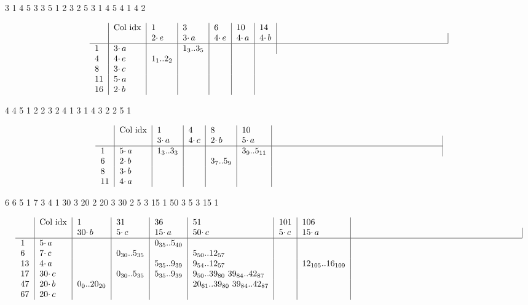 \documentclass{article}
\begin{document}
3 1   4 5   3 3   5 1   2 3
2 5   3 1   4 5   4 1   4 2


\[ \begin{tabular} {l | l | *{5}{l|} p{66mm} | }
& Col idx & 1 & 3 & 6 & 10 & 14   \\
 & & $2 \cdotp e$ & $3 \cdotp a$ & $4 \cdotp e$ & $4 \cdotp a$ & $4 \cdotp b$ &    \\
\hline 
1 & $3 \cdotp a$  &   & $1_{3}$..$3_{5}$   &     &   &    \\
4 & $4 \cdotp e$  & $1_{1}$..$2_{2}$  &     &   &    \\
8 & $3 \cdotp c$  &   &     &   &    \\
11 & $5 \cdotp a$  &   &     &   &    \\
16 & $2 \cdotp b$  &   &     &   &    \\
\end{tabular} \]

4 4
5 1    2 2    3 2     4 1
3 1    4 3    2 2     5 1

\[ \begin{tabular} {l | l | *{4}{l|} p{66mm} | }
& Col idx & 1 & 4 & 8 & 10    \\
 & & $3 \cdotp a$ & $4 \cdotp c$ & $2 \cdotp b$ & $5 \cdotp a$  &    \\
\hline 
1 & $5 \cdotp a$  &  $1_{3}$..$3_{3}$  &   &     &  $3_{9}$..$5_{11}$  &    \\
6 & $2 \cdotp b$  &   &     & $3_{7}$..$5_{9}$  &    \\
8 & $3 \cdotp b$  &   &     &   &    \\
11 & $4 \cdotp a$  &   &     &   &    \\
\end{tabular} \]

6 6
5 1   7 3    4 1    30 3    20 2    20 3         
30 2  5 3    15 1   50 3    5  3    15 1




\[ \begin{tabular} {l | l | *{6}{l|} p{66mm} | }
& Col idx & 1 & 31 & 36 & 51 & 101 & 106    \\
 & & $30 \cdotp b$ & $5 \cdotp c$ & $15 \cdotp a$ & $50 \cdotp c$  & $5 \cdotp c$  & $15 \cdotp a$  &  \\
\hline 
1 & $5 \cdotp a$  &    &   &  $0_{35}$..$5_{40}$   &    &   & \\
6 & $7 \cdotp c$  &   & $0_{30}$..$5_{35}$    &   & $5_{50}$..$12_{57}$ & &   \\
13 & $4 \cdotp a$  &   &     &  $5_{35}$..$9_{39}$ &  $9_{54}$..$12_{57}$  &   & $12_{105}$..$16_{109}$  \\
17 & $30 \cdotp c$  &   & $0_{30}$..$5_{35}$    & $5_{35}$..$9_{39}$  &  $9_{50}$..$39_{80}$  $39_{84}$..$42_{87}$  &   & \\
47 & $20 \cdotp b$  &  $0_{0}$..$20_{20}$   &     &   &  $20_{61}$..$39_{80}$ $39_{84}$..$42_{87}$   &   & \\
67 & $20 \cdotp c$  &   &     &   &     &   & \\
\end{tabular} \]
\end{document}

